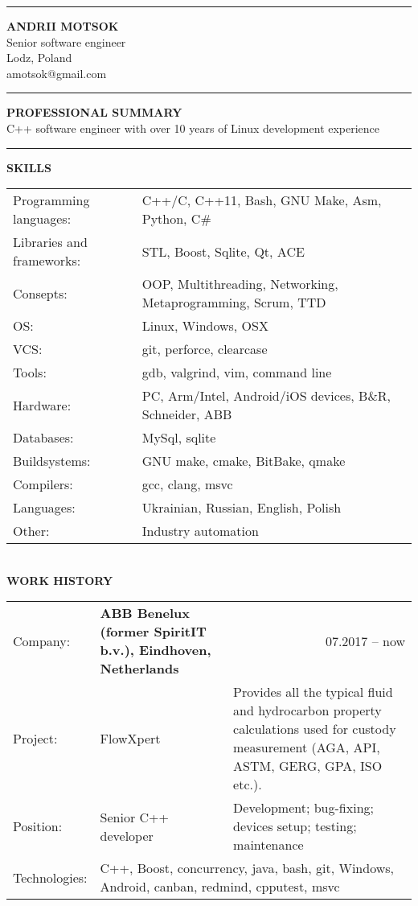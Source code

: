 \documentclass{article}
\begin{document}
\noindent\hrule height 5pt \vspace{4mm} \noindent
{\selectfont\huge{\textbf{ANDRII MOTSOK}}} \\
{\color{lightgray}Senior software engineer\\Lodz, Poland}\\
{\color{cyan}amotsok@gmail.com}\\
{\color{lightgray}\hrule height 0.2mm}
\vspace{2mm}
\noindent
\textbf{PROFESSIONAL SUMMARY}\\
C++ software engineer with over 10 years of Linux development experience\\
{\color{lightgray}\hrule height 0.2mm} \vspace{2mm}
\noindent
\textbf{SKILLS}\\
\noindent\begin{tabular}{@{}ll}
  Programming languages: & C++/C, C++11, Bash, GNU Make, Asm, Python, C\# \\
  Libraries and frameworks: & STL, Boost, Sqlite, Qt, ACE\\
  Consepts: & OOP, Multithreading, Networking, Metaprogramming, Scrum, TTD\\
  OS: & Linux, Windows, OSX\\
  VCS: & git, perforce, clearcase\\
  Tools: & gdb, valgrind, vim, command line\\
  Hardware: & PC, Arm/Intel, Android/iOS devices, B\&R, Schneider, ABB\\
  Databases: &MySql, sqlite\\
  Buildsystems: &GNU make, cmake, BitBake, qmake\\
  Compilers: &gcc, clang, msvc\\
  Languages: &Ukrainian, Russian, English, Polish\\
  Other: &  Industry automation\\
\end{tabular}\\
\vspace{2mm}
\noindent \textbf{WORK HISTORY}\\[2mm]
\noindent\begin{tabular}{@{}lp{45mm}p{115mm}}
  Company: & \textbf{ABB Benelux (former SpiritIT b.v.), Eindhoven, Netherlands} & \multicolumn{1}{r}{07.2017 -- now}\\
  Project: & FlowXpert& Provides all the typical fluid and hydrocarbon property calculations used for custody measurement (AGA, API, ASTM, GERG, GPA, ISO etc.).\\
  Position: & Senior C++ developer& Development; bug-fixing; devices setup; testing; maintenance\\
  Technologies: & \multicolumn{2}{p{160mm}}{C++, Boost, concurrency, java, bash, git, Windows, Android, canban, redmind, cpputest, msvc}\\
\end{tabular}\\[7mm]
\end{document}
